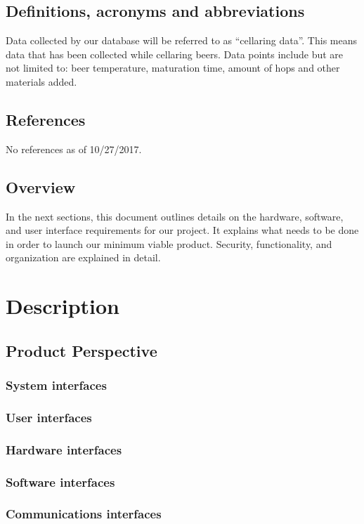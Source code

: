 \documentclass[draftclsnofoot,onecolumn,letterpaper,10pt,compsoc]{IEEEtran}
\begin{document}
	\subsection{Definitions, acronyms and abbreviations}
    Data collected by our database will be referred to as “cellaring data”. This means data that has been collected while cellaring beers. Data points include but are not limited to: beer temperature, maturation time, amount of hops and other materials added. 
    
	\subsection{References}
    No references as of 10/27/2017.
	\subsection{Overview}
    In the next sections, this document outlines details on the hardware, software, and user interface requirements for our project. It explains what needs to be done in order to launch our minimum viable product. Security, functionality, and organization are explained in detail.

\section{Description}
	\subsection{Product Perspective}
		\subsubsection{System interfaces}
		\subsubsection{User interfaces}
		\subsubsection{Hardware interfaces}
		\subsubsection{Software interfaces}
		\subsubsection{Communications interfaces}
\end{document}
